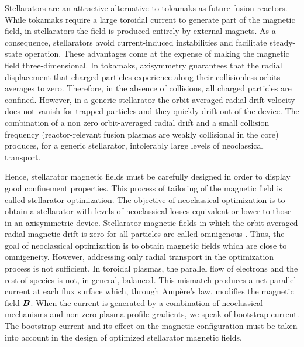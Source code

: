 Stellarators are an attractive alternative to tokamaks as future fusion reactors. While tokamaks require a large toroidal current to generate part of the magnetic field, in stellarators the field is produced entirely by external magnets. As a consequence, stellarators avoid current-induced instabilities and facilitate steady-state operation. These advantages come at the expense of making the magnetic field three-dimensional. In tokamaks, axisymmetry guarantees that the radial displacement that charged particles experience along their collisionless orbits averages to zero. Therefore, in the absence of collisions, all charged particles are confined. However, in a generic stellarator the orbit-averaged radial drift velocity does not vanish for trapped particles and they quickly drift out of the device. The combination of a non zero orbit-averaged radial drift and a small collision frequency (reactor-relevant fusion plasmas are weakly collisional in the core) produces, for a generic stellarator, intolerably large levels of neoclassical transport. 

Hence, stellarator magnetic fields must be carefully designed in order to display good confinement properties. This process of tailoring of the magnetic field is called stellarator optimization. The objective of neoclassical optimization is to obtain a stellarator with levels of neoclassical losses equivalent or lower to those in an axisymmetric device. Stellarator magnetic fields in which the orbit-averaged radial magnetic drift is zero for all particles are called omnigenous \cite{Cary1997OmnigenityAQ}. Thus, the goal of neoclassical optimization is to obtain magnetic fields which are close to omnigeneity. However, addressing only radial transport in the optimization process is not sufficient. In toroidal plasmas, the parallel flow of electrons and the rest of species is not, in general, balanced. This mismatch produces a net parallel current at each flux surface which, through Ampère's law, modifies the magnetic field $\vb*{B}$. When the current is generated by a combination of neoclassical mechanisms and non-zero plasma profile gradients, we speak of bootstrap current. The bootstrap current and its effect on the magnetic configuration must be taken into account in the design of optimized stellarator magnetic fields. 

